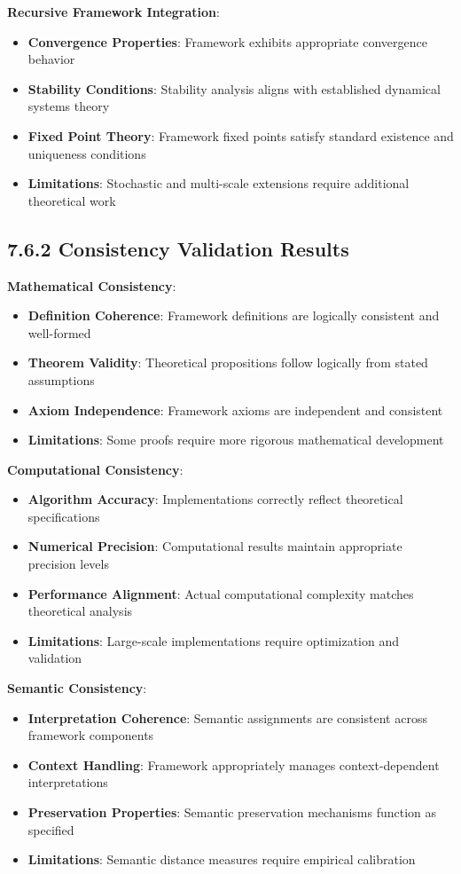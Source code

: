 \textbf{Recursive Framework Integration}:
\begin{itemize}
\item \textbf{Convergence Properties}: Framework exhibits appropriate convergence behavior
\item \textbf{Stability Conditions}: Stability analysis aligns with established dynamical systems theory
\item \textbf{Fixed Point Theory}: Framework fixed points satisfy standard existence and uniqueness conditions
\item \textbf{Limitations}: Stochastic and multi-scale extensions require additional theoretical work
\end{itemize}

\subsection{7.6.2 Consistency Validation Results}

\textbf{Mathematical Consistency}:
\begin{itemize}
\item \textbf{Definition Coherence}: Framework definitions are logically consistent and well-formed
\item \textbf{Theorem Validity}: Theoretical propositions follow logically from stated assumptions
\item \textbf{Axiom Independence}: Framework axioms are independent and consistent
\item \textbf{Limitations}: Some proofs require more rigorous mathematical development
\end{itemize}

\textbf{Computational Consistency}:
\begin{itemize}
\item \textbf{Algorithm Accuracy}: Implementations correctly reflect theoretical specifications
\item \textbf{Numerical Precision}: Computational results maintain appropriate precision levels
\item \textbf{Performance Alignment}: Actual computational complexity matches theoretical analysis
\item \textbf{Limitations}: Large-scale implementations require optimization and validation
\end{itemize}

\textbf{Semantic Consistency}:
\begin{itemize}
\item \textbf{Interpretation Coherence}: Semantic assignments are consistent across framework components
\item \textbf{Context Handling}: Framework appropriately manages context-dependent interpretations
\item \textbf{Preservation Properties}: Semantic preservation mechanisms function as specified
\item \textbf{Limitations}: Semantic distance measures require empirical calibration
\end{itemize}

